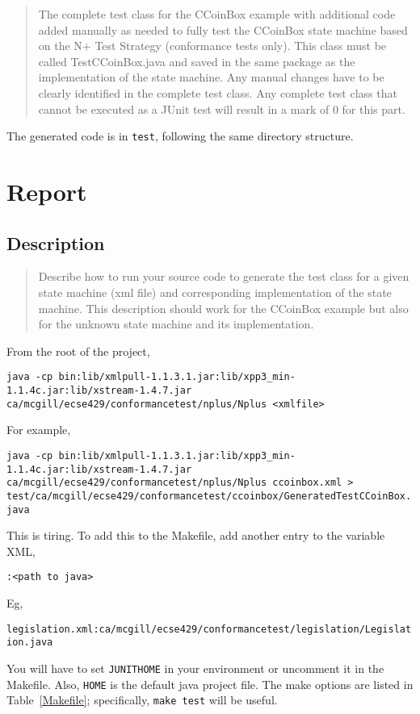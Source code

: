 \documentclass[ieee]{submit}
\begin{document}
\begin{quote}
The complete test class for the CCoinBox example with additional code added manually as
needed to fully test the CCoinBox state machine based on the N+ Test Strategy (conformance tests only). This class must be called TestCCoinBox.java and saved in the same package as the implementation of the state machine. Any manual changes have to be clearly identified in the
complete test class. Any complete test class that cannot be executed as a JUnit test will result in a mark of 0 for this part.
\end{quote}

The generated code is in {\tt test}, following the same directory structure.

\section{Report}

\subsection{Description}

\begin{quote}
Describe how to run your source code to generate the test class for a given state machine (xml file) and corresponding implementation of the state machine. This description should work for the CCoinBox example but also for the unknown state machine and its implementation.
\end{quote}

From the root of the project,

{\tt java -cp bin:lib/xmlpull-1.1.3.1.jar:lib/xpp3\_min-1.1.4c.jar:lib/xstream-1.4.7.jar ca/mcgill/ecse429/conformancetest/nplus/Nplus <xmlfile>}

For example,

{\tt java -cp bin:lib/xmlpull-1.1.3.1.jar:lib/xpp3\_min-1.1.4c.jar:lib/xstream-1.4.7.jar ca/mcgill/ecse429/conformancetest/nplus/Nplus ccoinbox.xml > test/ca/mcgill/ecse429/conformancetest/ccoinbox/GeneratedTestCCoinBox.java}

This is tiring. To add this to the Makefile, add another entry to the variable XML,

{\tt <xml file>:<path to java>}

Eg,

{\tt legislation.xml:ca/mcgill/ecse429/conformancetest/legislation/Legislation.java}

You will have to set {\tt JUNITHOME} in your environment or uncomment it in the Makefile. Also, {\tt HOME} is the default java project file. The make options are listed in Table~\ref{Makefile}; specifically, {\tt make test} will be useful.
\end{document}
